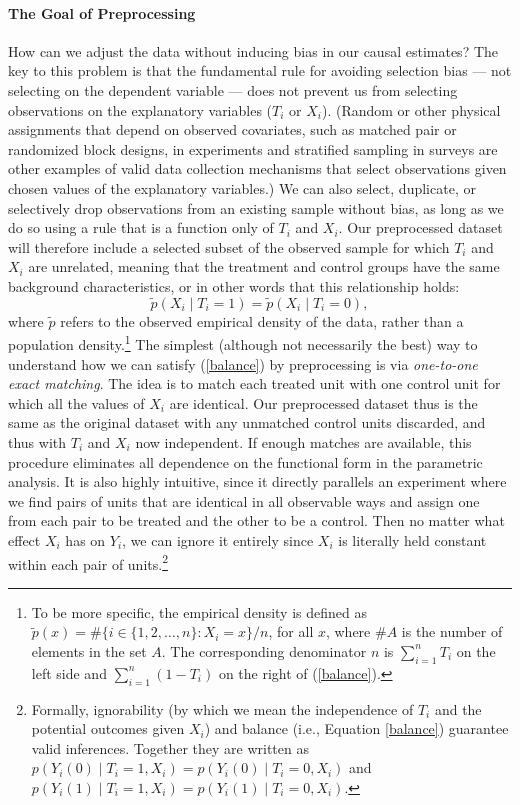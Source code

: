 \documentclass[11pt,titlepage]{article}
\begin{document}
\paragraph{The Goal of Preprocessing}
How can we adjust the data without inducing bias in our causal
estimates?  The key to this problem is that the fundamental rule for
avoiding selection bias --- not selecting on the dependent variable
--- does not prevent us from selecting observations on the explanatory
variables ($T_i$ or $X_i$).  (Random or other physical assignments
that depend on observed covariates, such as matched pair or randomized
block designs, in experiments and stratified sampling in surveys are
other examples of valid data collection mechanisms that select
observations given chosen values of the explanatory variables.)  We
can also select, duplicate, or selectively drop observations from an
existing sample without bias, as long as we do so using a rule that is
a function only of $T_i$ and $X_i$.  Our preprocessed dataset will
therefore include a selected subset of the observed sample for which
$T_i$ and $X_i$ are unrelated, meaning that the treatment and control
groups have the same background characteristics, or in other words
that this relationship holds:
\begin{equation}
  \label{balance}
  \tilde p(X_i\mid T_i=1) = \tilde p(X_i\mid T_i=0),
\end{equation}
where $\tilde p$ refers to the observed empirical density of the data,
rather than a population density.\footnote{To be more specific, the
  empirical density is defined as $\tilde p(x) = \# \{ i\in \{1, 2,
  \dots, n \}: X_i = x \} / n$, for all $x$, where $\#A$ is the number
  of elements in the set $A$.  The corresponding denominator $n$ is
  $\sum_{i=1}^n T_i$ on the left side and $\sum_{i=1}^n (1-T_i)$ on
  the right of (\ref{balance}).}  The simplest (although not necessarily the best) way to
understand how we can satisfy (\ref{balance}) by preprocessing is via
\emph{one-to-one exact matching}.  The idea is to match each treated
unit with one control unit for which all the values of $X_i$ are
identical.  Our preprocessed dataset thus is the same as the original
dataset with any unmatched control units discarded, and thus with
$T_i$ and $X_i$ now independent.  If enough matches are available,
this procedure eliminates all dependence on the functional form in the
parametric analysis.  It is also highly intuitive, since it directly
parallels an experiment where we find pairs of units that are
identical in all observable ways and assign one from each pair to be
treated and the other to be a control.  Then no matter what effect
$X_i$ has on $Y_i$, we can ignore it entirely since $X_i$ is literally
held constant within each pair of units.\footnote{Formally,
  ignorability (by which we mean the independence of $T_i$ and the
  potential outcomes given $X_i$) and balance (i.e., Equation
  \ref{balance}) guarantee valid inferences.  Together they are
  written as $p(Y_i(0)\mid T_i=1,X_i)=p(Y_i(0)\mid T_i=0,X_i)$ and
  $p(Y_i(1)\mid T_i=1,X_i)=p(Y_i(1)\mid T_i=0,X_i)$.}
\end{document}
